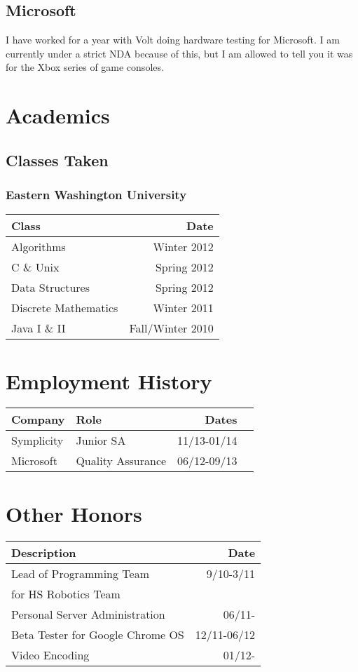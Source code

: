 \documentclass[twocolumn]{article}
\begin{document}
\subsection{Microsoft}

I have worked for a year with Volt doing hardware testing for Microsoft. I am currently under a strict NDA because of this, but I am allowed to tell you it was for the Xbox series of game consoles.

\section{Academics}

\subsection{Classes Taken}

\subsubsection{Eastern Washington University}

\begin{tabular}{| l | r |}
    Class & Date \\
    \hline
    Algorithms & Winter 2012 \\
    C \& Unix & Spring 2012 \\
    Data Structures & Spring 2012 \\
    Discrete Mathematics & Winter 2011 \\
    Java I \& II & Fall/Winter 2010 \\
\end{tabular}

\section{Employment History}

\begin{tabular}{| l | l | r | l |}
    Company & Role & Dates \\
    \hline
    Symplicity & Junior SA & 11/13-01/14 \\
    Microsoft & Quality Assurance & 06/12-09/13
\end{tabular}

\section{Other Honors}

\begin{tabular}{| l | r |}
    Description & Date \\ \hline
    Lead of Programming Team & 9/10-3/11 \\ 
    for HS Robotics Team & \\ \hline
    Personal Server Administration & 06/11-  \\ \hline
    Beta Tester for Google Chrome OS & 12/11-06/12 \\ \hline
    Video Encoding & 01/12- \\
\end{tabular}
\end{document}
